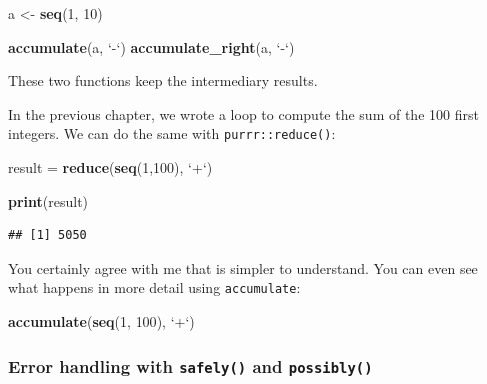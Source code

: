 \documentclass[]{gitbook}
\newenvironment{Shaded}{\begin{snugshade}}{\end{snugshade}}
\newcommand{\DataTypeTok}[1]{\textcolor[rgb]{0.13,0.29,0.53}{#1}}
\newcommand{\DecValTok}[1]{\textcolor[rgb]{0.00,0.00,0.81}{#1}}
\newcommand{\KeywordTok}[1]{\textcolor[rgb]{0.13,0.29,0.53}{\textbf{#1}}}
\newcommand{\NormalTok}[1]{#1}
\newcommand{\StringTok}[1]{\textcolor[rgb]{0.31,0.60,0.02}{#1}}
\begin{document}
\begin{Shaded}
\begin{Highlighting}[]
\NormalTok{a <-}\StringTok{ }\KeywordTok{seq}\NormalTok{(}\DecValTok{1}\NormalTok{, }\DecValTok{10}\NormalTok{)}

\KeywordTok{accumulate}\NormalTok{(a, }\StringTok{`}\DataTypeTok{-}\StringTok{`}\NormalTok{)}
\KeywordTok{accumulate_right}\NormalTok{(a, }\StringTok{`}\DataTypeTok{-}\StringTok{`}\NormalTok{)}
\end{Highlighting}
\end{Shaded}

These two functions keep the intermediary results.

In the previous chapter, we wrote a loop to compute the sum of the 100 first integers. We can do
the same with \texttt{purrr::reduce()}:

\begin{Shaded}
\begin{Highlighting}[]
\NormalTok{result =}\StringTok{ }\KeywordTok{reduce}\NormalTok{(}\KeywordTok{seq}\NormalTok{(}\DecValTok{1}\NormalTok{,}\DecValTok{100}\NormalTok{), }\StringTok{`}\DataTypeTok{+}\StringTok{`}\NormalTok{)}

\KeywordTok{print}\NormalTok{(result)}
\end{Highlighting}
\end{Shaded}

\begin{verbatim}
## [1] 5050
\end{verbatim}

You certainly agree with me that is simpler to understand. You can even see what happens in more
detail using \texttt{accumulate}:

\begin{Shaded}
\begin{Highlighting}[]
\KeywordTok{accumulate}\NormalTok{(}\KeywordTok{seq}\NormalTok{(}\DecValTok{1}\NormalTok{, }\DecValTok{100}\NormalTok{), }\StringTok{`}\DataTypeTok{+}\StringTok{`}\NormalTok{)}
\end{Highlighting}
\end{Shaded}

\hypertarget{error-handling-with-safely-and-possibly}{%
\subsubsection{\texorpdfstring{Error handling with \texttt{safely()} and \texttt{possibly()}}{Error handling with safely() and possibly()}}\label{error-handling-with-safely-and-possibly}}
\end{document}
